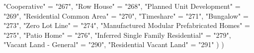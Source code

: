 \documentclass[]{book}
\newenvironment{Shaded}{\begin{snugshade}}{\end{snugshade}}
\newcommand{\StringTok}[1]{\textcolor[rgb]{0.31,0.60,0.02}{#1}}
\newcommand{\NormalTok}[1]{#1}
\theoremstyle{definition}
\theoremstyle{definition}
\theoremstyle{definition}
\theoremstyle{remark}
\begin{document}
\begin{Shaded}
\begin{Highlighting}[]
{{{{      \StringTok{"Cooperative"}\NormalTok{                              =}\StringTok{ "267"}\NormalTok{,}
      \StringTok{"Row House"}\NormalTok{                                =}\StringTok{ "268"}\NormalTok{,}
      \StringTok{"Planned Unit Development"}\NormalTok{                 =}\StringTok{ "269"}\NormalTok{,}
      \StringTok{"Residential Common Area"}\NormalTok{                  =}\StringTok{ "270"}\NormalTok{,}
      \StringTok{"Timeshare"}\NormalTok{                                =}\StringTok{ "271"}\NormalTok{,}
      \StringTok{"Bungalow"}\NormalTok{                                 =}\StringTok{ "273"}\NormalTok{,}
      \StringTok{"Zero Lot Line"}\NormalTok{                            =}\StringTok{ "274"}\NormalTok{,}
      \StringTok{"Manufactured Modular Prefabricated Homes"}\NormalTok{ =}\StringTok{ "275"}\NormalTok{,}
      \StringTok{"Patio Home"}\NormalTok{                               =}\StringTok{ "276"}\NormalTok{,}
      \StringTok{"Inferred Single Family Residential"}\NormalTok{       =}\StringTok{ "279"}\NormalTok{,}
      \StringTok{"Vacant Land - General"}\NormalTok{                    =}\StringTok{ "290"}\NormalTok{,}
      \StringTok{"Residential Vacant Land"}\NormalTok{                  =}\StringTok{ "291"}
\NormalTok{      )}
\NormalTok{    )}

}}}}
\end{Highlighting}
\end{Shaded}
\end{document}
